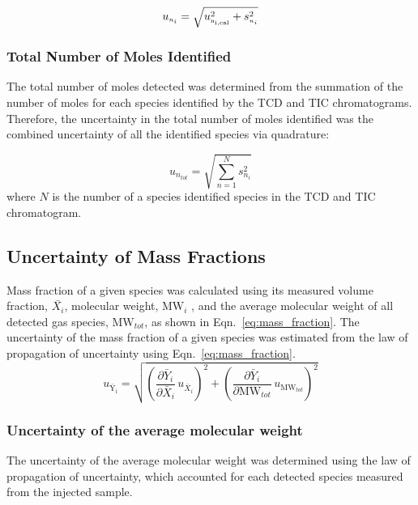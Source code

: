 \documentclass[12pt]{article}
\begin{document}
\begin{equation}
\label{eq:gasspeciesuncertaintycertainty}
u_{\scriptscriptstyle n_{i}} = \sqrt{ u_{\rm \scriptscriptstyle n_{i,cal}}^2 + s_{\scriptscriptstyle n_{i}}^2}
\end{equation}

\subsubsection{Total Number of Moles Identified}
\label{ssec:Total Number of Moles Identified}
The total number of moles detected was determined from the summation of the number of moles for each species identified by the TCD and TIC chromatograms. Therefore, the uncertainty in the total number of moles identified was the combined uncertainty of all the identified species via quadrature:

\begin{equation}
\label{eq:totalnumberofmolesdetected}
u_{\scriptscriptstyle n_{tot}}=\sqrt{{\sum_{n=1}^{N} s_{\scriptscriptstyle n_{i}}^2}}
\end{equation}
where $N$ is the number of a species identified species in the TCD and TIC chromatogram. 

\subsection{Uncertainty of Mass Fractions}
\label{ssec:Uncertainty of Mass Fractions}
Mass fraction of a given species was calculated using its measured volume fraction, $\bar{X_{i}}$, molecular weight, $\textrm{MW}_i$ , and the average molecular weight of all detected gas species, $\textrm{MW}_{tot}$, as shown in Eqn.~\ref{eq:mass_fraction}. The uncertainty of the mass fraction of a given species was estimated from the law of propagation of uncertainty using Eqn.~\ref{eq:mass_fraction}.
\begin{equation}\label{eq:Mass_Frac_Uncertainty}
u_\mathrm{\bar{Y}_{i}} = \sqrt{{\left( \frac{\partial \bar{Y}_{i}}{\partial \bar{X}_{i}}\,u_{\scriptscriptstyle \bar{X}_{i}} \right)}^2+{\left(\frac{\partial \bar{Y}_{i}}{\partial \textrm{MW}_{tot}}\,u_{\scriptscriptstyle \textrm{MW}_{tot}}\right)}^2}
\end{equation}

\subsubsection{Uncertainty of the average molecular weight}
\label{ssec:Uncertainty of the average molecular weight}
The uncertainty of the average molecular weight was determined using the law of propagation of uncertainty, which accounted for each detected species measured from the injected sample. 
\end{document}
